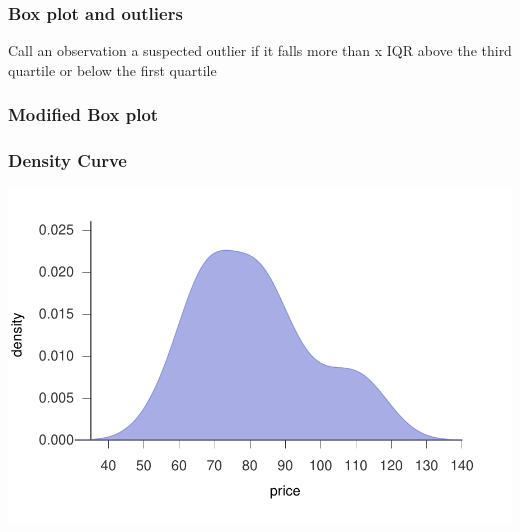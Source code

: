 \documentclass[12pt]{beamer}\usepackage[]{graphicx}\usepackage[]{color}
\newenvironment{knitrout}{}{} %
\begin{document}

\begin{frame}
\frametitle{Box plot and outliers}

Call an observation a suspected outlier if it falls more than { x IQR} above the third quartile or below the first quartile
\eb
\end{frame}


\begin{frame}
\frametitle{Modified Box plot}
\begin{center}
\end{center}
\end{frame}


\begin{frame}
\begin{center}
\Huge{}
\end{center}
\end{frame}


\begin{frame}[fragile]
\frametitle{Density Curve}
\begin{knitrout}\footnotesize
{}\color{fgcolor}

{\centering \includegraphics[width=.8\linewidth,height=.6\linewidth]{figure/unnamed-chunk-26-1} 

}



\end{knitrout}

\end{frame}
\end{document}
